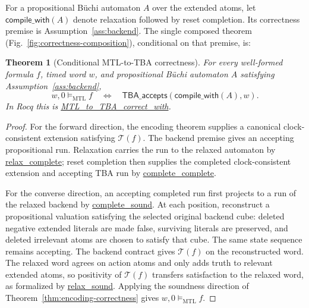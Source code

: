 \documentclass{ieeeaccess}
\newtheorem{theorem}{Theorem}[section]
\newcommand{\satM}{\models_{\mathrm{MTL}}}
\newcommand{\T}{\mathcal{T}}
\newcommand{\Rocqid}[1]{\url{#1}}
\begin{document}
For a propositional B\"uchi automaton $A$ over the extended atoms, let
$\mathsf{compile\_with}(A)$ denote relaxation followed by reset completion.
Its correctness premise is Assumption~\ref{ass:backend}. The single composed
theorem (Fig.~\ref{fig:correctness-composition}), conditional on that premise, is:
\begin{theorem}[Conditional MTL-to-TBA correctness]
\label{thm:mtl-to-tba-correct}
For every well-formed formula $f$, timed word $w$, and propositional
B\"uchi automaton $A$ satisfying Assumption~\ref{ass:backend},
\[
w,0\satM f
\quad\Longleftrightarrow\quad
\mathsf{TBA\_accepts}(\mathsf{compile\_with}(A),w).
\]
In Rocq this is \Rocqid{MTL_to_TBA_correct_with}.
\end{theorem}
\begin{proof}
For the forward direction, the encoding theorem supplies a canonical clock-consistent
extension satisfying $\T(f)$. The backend premise gives an accepting
propositional run. Relaxation carries the run to the relaxed automaton by
\Rocqid{relax_complete}; reset completion then supplies the completed
clock-consistent extension and accepting TBA run by
\Rocqid{complete_complete}.

For the converse direction, an accepting completed run first projects to a run of the
relaxed backend by \Rocqid{complete_sound}. At each position, reconstruct a
propositional valuation satisfying the selected original backend cube:
deleted negative extended literals are made false, surviving literals are
preserved, and deleted irrelevant atoms are chosen to satisfy that cube. The
same state sequence remains accepting. The backend contract gives
$\T(f)$ on the reconstructed word. The relaxed word agrees on action atoms
and only adds truth to relevant extended atoms, so positivity of $\T(f)$
transfers satisfaction to the relaxed word, as formalized by
\Rocqid{relax_sound}. Applying the soundness direction of
Theorem~\ref{thm:encoding-correctness} gives $w,0\satM f$.
\end{proof}
\end{document}
